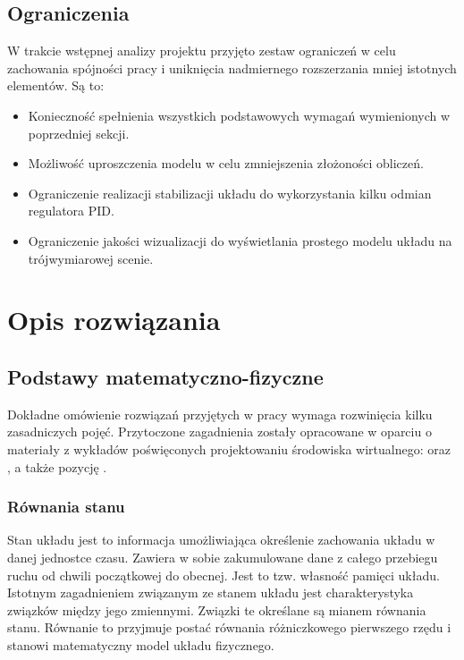 \documentclass[12pt, oneside]{report}
\theoremstyle{definition}
\begin{document}
\section{Ograniczenia}
W trakcie wstępnej analizy projektu przyjęto zestaw ograniczeń w celu zachowania spójności pracy i uniknięcia nadmiernego rozszerzania mniej istotnych elementów. Są to:
\begin{itemize}
\item Konieczność spełnienia wszystkich podstawowych wymagań wymienionych w poprzedniej sekcji.
\item Możliwość uproszczenia modelu w celu zmniejszenia złożoności obliczeń.
\item Ograniczenie realizacji stabilizacji układu do wykorzystania kilku odmian regulatora PID.
\item Ograniczenie jakości wizualizacji do wyświetlania prostego modelu układu na trójwymiarowej scenie.
\end{itemize}

\newpage
\chapter{Opis rozwiązania}
\section{Podstawy matematyczno-fizyczne}
Dokładne omówienie rozwiązań przyjętych w pracy wymaga rozwinięcia kilku zasadniczych pojęć. Przytoczone zagadnienia zostały opracowane w oparciu o materiały z wykładów poświęconych projektowaniu środowiska wirtualnego: \cite{MarciniakControlSystems} oraz \cite{MarciniakClosedLoop}, a także pozycję \cite{RungeKutta}.

\subsection{Równania stanu}
\label{StateSpaceSubsection}
Stan układu jest to informacja umożliwiająca określenie zachowania układu w danej jednostce czasu. Zawiera w sobie zakumulowane dane z całego przebiegu ruchu od chwili początkowej do obecnej. Jest to tzw. własność pamięci układu. Istotnym zagadnieniem związanym ze stanem układu jest charakterystyka związków między jego zmiennymi. Związki te określane są mianem równania stanu. Równanie to przyjmuje postać równania różniczkowego pierwszego rzędu i stanowi matematyczny model układu fizycznego.
\end{document}
